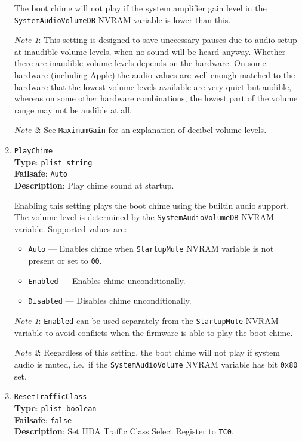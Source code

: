 \documentclass[]{article}
\providecommand{\tightlist}{%
  \setlength{\itemsep}{0pt}\setlength{\parskip}{0pt}}
\begin{document}
\begin{enumerate}
  The boot chime will not play if the system amplifier gain level in the
  \texttt{SystemAudioVolumeDB} NVRAM variable is lower than this.

  \emph{Note 1}: This setting is designed to save unecessary pauses due to audio setup at inaudible volume
  levels, when no sound will be heard anyway. Whether there are inaudible volume levels depends on the
  hardware. On some hardware (including Apple) the audio values are well enough matched to the hardware
  that the lowest volume levels available are very quiet but audible, whereas on some other hardware combinations,
  the lowest part of the volume range may not be audible at all.

  \emph{Note 2}: See \texttt{MaximumGain} for an explanation of decibel volume levels.

\item
  \texttt{PlayChime}\\
  \textbf{Type}: \texttt{plist\ string}\\
  \textbf{Failsafe}: \texttt{Auto}\\
  \textbf{Description}: Play chime sound at startup.

  Enabling this setting plays the boot chime using the builtin audio support. The volume
  level is determined by the \texttt{SystemAudioVolumeDB} NVRAM variable. Supported values are:

  \begin{itemize}
    \tightlist
    \item \texttt{Auto} --- Enables chime when \texttt{StartupMute} NVRAM variable
      is not present or set to \texttt{00}.
    \item \texttt{Enabled} --- Enables chime unconditionally.
    \item \texttt{Disabled} --- Disables chime unconditionally.
  \end{itemize}

  \emph{Note 1}: \texttt{Enabled} can be used separately from the \texttt{StartupMute}
  NVRAM variable to avoid conflicts when the firmware is able to play the boot chime.

  \emph{Note 2}: Regardless of this setting, the boot chime will not play if system audio is muted,
  i.e.~if the \texttt{SystemAudioVolume} NVRAM variable has bit \texttt{0x80} set.

\item
  \texttt{ResetTrafficClass}\\
  \textbf{Type}: \texttt{plist\ boolean}\\
  \textbf{Failsafe}: \texttt{false}\\
  \textbf{Description}: Set HDA Traffic Class Select Register to \texttt{TC0}.


\end{enumerate}
\end{document}
